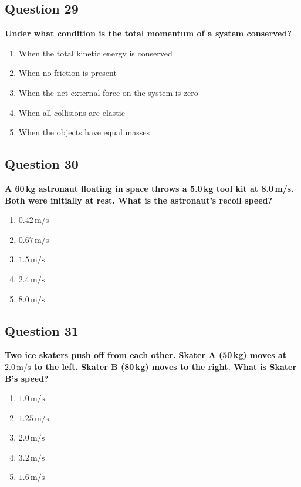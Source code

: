 \documentclass[12pt,letterpaper]{article}
\begin{document}
\subsection{Question 29}

\begin{questionbox}
\textbf{Under what condition is the total momentum of a system conserved?}

\begin{enumerate}[label=\alph*)]
    \item When the total kinetic energy is conserved
    \item When no friction is present
    \item When the net external force on the system is zero
    \item When all collisions are elastic
    \item When the objects have equal masses
\end{enumerate}
\end{questionbox}

\subsection{Question 30}

\begin{questionbox}
\textbf{A 60\,kg astronaut floating in space throws a 5.0\,kg tool kit at 8.0\,m/s. Both were initially at rest. What is the astronaut's recoil speed?}

\begin{enumerate}[label=\alph*)]
    \item $0.42\,\text{m/s}$
    \item $0.67\,\text{m/s}$
    \item $1.5\,\text{m/s}$
    \item $2.4\,\text{m/s}$
    \item $8.0\,\text{m/s}$
\end{enumerate}
\end{questionbox}

\subsection{Question 31}

\begin{questionbox}
\textbf{Two ice skaters push off from each other. Skater A (50\,kg) moves at $2.0\,\text{m/s}$ to the left. Skater B (80\,kg) moves to the right. What is Skater B's speed?}

\begin{enumerate}[label=\alph*)]
    \item $1.0\,\text{m/s}$
    \item $1.25\,\text{m/s}$
    \item $2.0\,\text{m/s}$
    \item $3.2\,\text{m/s}$
    \item $1.6\,\text{m/s}$
\end{enumerate}
\end{questionbox}
\end{document}
